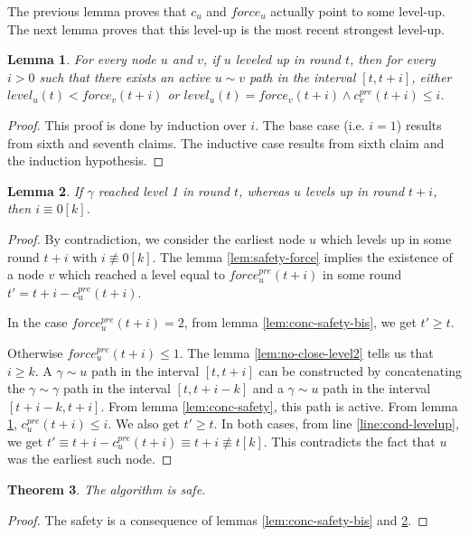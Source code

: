 \documentclass[11pt,letterpaper]{article}
\newtheorem{thm}{Theorem}
\newtheorem{lem}[thm]{Lemma}
\newcommand{\cent}{\gamma}
\begin{document}
The previous lemma proves that $c_u$ and $force_u$ actually point to some level-up.
The next lemma proves that this level-up is the most recent strongest level-up.
\begin{lem} \label{lem:strongest}
	For every node $u$ and $v$, if $u$ leveled up in round $t$,
	then for every $i > 0$ such that there exists an active $u \sim v$ path in the interval $[t,t+i]$,
	either $level_u(t) < force_v(t+i)$ or $level_u(t) = force_v(t+i) \wedge c^{pre}_v(t+i) \leq i$.
\end{lem}
\begin{proof}
	This proof is done by induction over $i$.
	The base case (i.e. $i = 1$) results from sixth and seventh claims.
	The inductive case results from sixth claim and the induction hypothesis.
\end{proof}

\begin{lem} \label{lem:later-level1}
	If $\cent$ reached level 1 in round $t$, whereas $u$ levels up in round $t+i$, then $i \equiv 0 [k]$. 
\end{lem}
\begin{proof}
	By contradiction, we consider the earliest node $u$ which levels up in some round $t+i$ with $i \not\equiv 0 [k]$.
	The lemma \ref{lem:safety-force} implies the existence of a node $v$ which reached a level equal to $force_u^{pre}(t+i)$ in some round $t' = t+i-c_u^{pre}(t+i)$. 

	In the case $force_u^{pre}(t+i) = 2$, from lemma \ref{lem:conc-safety-bis}, we get $t' \geq t$.

	Otherwise $force_u^{pre}(t+i) \leq 1$.
	The lemma \ref{lem:no-close-level2} tells us that $i \geq k$.
	A $\cent \sim u$ path in the interval $[t,t+i]$ can be constructed by concatenating the $\cent \sim \cent$ path in the interval $[t,t+i-k]$
	and a $\cent \sim u$ path in the interval $[t+i-k,t+i]$.
	From lemma \ref{lem:conc-safety}, this path is active.
	From lemma \ref{lem:strongest}, $c_u^{pre}(t+i) \leq i$.
	We also get $t' \geq t$.
	In both cases, from line \ref{line:cond-levelup}, we get $t' \equiv t+i-c_u^{pre}(t+i) \equiv t+i \not\equiv t [k]$.
	This contradicts the fact that $u$ was the earliest such node.
\end{proof}

\begin{thm} \label{lem:safety} 
	The algorithm is safe.
\end{thm}
\begin{proof}
	The safety is a consequence of lemmas \ref{lem:conc-safety-bis} and \ref{lem:later-level1}.
\end{proof}
\end{document}
